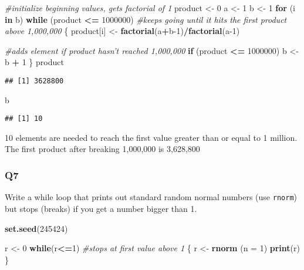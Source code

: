 \documentclass[
]{article}
\newenvironment{Shaded}{\begin{snugshade}}{\end{snugshade}}
\newcommand{\CommentTok}[1]{\textcolor[rgb]{0.56,0.35,0.01}{\textit{#1}}}
\newcommand{\ControlFlowTok}[1]{\textcolor[rgb]{0.13,0.29,0.53}{\textbf{#1}}}
\newcommand{\DataTypeTok}[1]{\textcolor[rgb]{0.13,0.29,0.53}{#1}}
\newcommand{\DecValTok}[1]{\textcolor[rgb]{0.00,0.00,0.81}{#1}}
\newcommand{\KeywordTok}[1]{\textcolor[rgb]{0.13,0.29,0.53}{\textbf{#1}}}
\newcommand{\NormalTok}[1]{#1}
\newcommand{\OperatorTok}[1]{\textcolor[rgb]{0.81,0.36,0.00}{\textbf{#1}}}
\newcommand{\StringTok}[1]{\textcolor[rgb]{0.31,0.60,0.02}{#1}}
\begin{document}
\begin{Shaded}
\begin{Highlighting}[]
\CommentTok{#initialize beginning values, gets factorial of 1}
\NormalTok{product <-}\StringTok{ }\DecValTok{0}
\NormalTok{a <-}\StringTok{ }\DecValTok{1}
\NormalTok{b <-}\StringTok{ }\DecValTok{1}
\ControlFlowTok{for}\NormalTok{ (i }\ControlFlowTok{in}\NormalTok{ b)}
\ControlFlowTok{while}\NormalTok{ (product }\OperatorTok{<=}\StringTok{ }\DecValTok{1000000}\NormalTok{) }\CommentTok{#keeps going until it hits the first product above 1,000,000}
\NormalTok{  \{}
\NormalTok{      product[i] <-}\StringTok{ }\KeywordTok{factorial}\NormalTok{(a}\OperatorTok{+}\NormalTok{b}\DecValTok{-1}\NormalTok{)}\OperatorTok{/}\KeywordTok{factorial}\NormalTok{(a}\DecValTok{-1}\NormalTok{)}
      
      \CommentTok{#adds element if product hasn't reached 1,000,000}
      \ControlFlowTok{if}\NormalTok{ (product }\OperatorTok{<=}\StringTok{ }\DecValTok{1000000}\NormalTok{) }
\NormalTok{      b <-}\StringTok{ }\NormalTok{b }\OperatorTok{+}\StringTok{ }\DecValTok{1}
\NormalTok{  \}}
\NormalTok{product}
\end{Highlighting}
\end{Shaded}

\begin{verbatim}
## [1] 3628800
\end{verbatim}

\begin{Shaded}
\begin{Highlighting}[]
\NormalTok{b}
\end{Highlighting}
\end{Shaded}

\begin{verbatim}
## [1] 10
\end{verbatim}

10 elements are needed to reach the first value greater than or equal to
1 million. The first product after breaking 1,000,000 is 3,628,800

\hypertarget{q7}{%
\subsubsection{Q7}\label{q7}}

Write a while loop that prints out standard random normal numbers (use
\texttt{rnorm}) but stops (breaks) if you get a number bigger than 1.

\begin{Shaded}
\begin{Highlighting}[]
\KeywordTok{set.seed}\NormalTok{(}\DecValTok{245424}\NormalTok{)}

\NormalTok{r <-}\StringTok{ }\DecValTok{0}
\ControlFlowTok{while}\NormalTok{(r}\OperatorTok{<=}\DecValTok{1}\NormalTok{) }\CommentTok{#stops at first value above 1}
\NormalTok{\{}
\NormalTok{  r <-}\StringTok{ }\KeywordTok{rnorm}\NormalTok{ (}\DataTypeTok{n =} \DecValTok{1}\NormalTok{)}
  \KeywordTok{print}\NormalTok{(r) }
\NormalTok{\}}
\end{Highlighting}
\end{Shaded}
\end{document}
